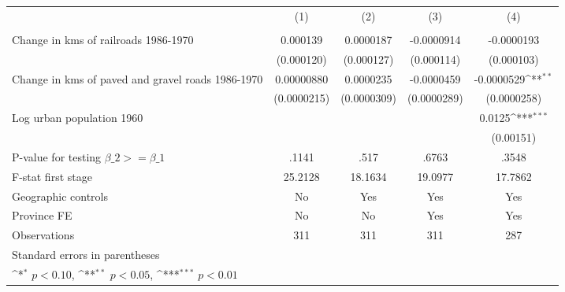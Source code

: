 {
\def\sym#1{\ifmmode^{#1}\else\(^{#1}\)\fi}
\begin{tabular}{l*{4}{c}}
\hline\hline
                &\multicolumn{1}{c}{(1)}&\multicolumn{1}{c}{(2)}&\multicolumn{1}{c}{(3)}&\multicolumn{1}{c}{(4)}\\
                &\multicolumn{1}{c}{}&\multicolumn{1}{c}{}&\multicolumn{1}{c}{}&\multicolumn{1}{c}{}\\
\hline
Change in kms of railroads 1986-1970& 0.000139         &0.0000187         &-0.0000914         &-0.0000193         \\
                &(0.000120)         &(0.000127)         &(0.000114)         &(0.000103)         \\
[1em]
Change in kms of paved and gravel roads 1986-1970&0.00000880         &0.0000235         &-0.0000459         &-0.0000529\sym{**} \\
                &(0.0000215)         &(0.0000309)         &(0.0000289)         &(0.0000258)         \\
[1em]
Log urban population 1960&                  &                  &                  &   0.0125\sym{***}\\
                &                  &                  &                  &(0.00151)         \\
\hline
P-value for testing $\beta\_{2} >= \beta\_{1}$&    .1141         &     .517         &    .6763         &    .3548         \\
F-stat first stage&  25.2128         &  18.1634         &  19.0977         &  17.7862         \\
Geographic controls&       No         &      Yes         &      Yes         &      Yes         \\
Province FE     &       No         &       No         &      Yes         &      Yes         \\
Observations    &      311         &      311         &      311         &      287         \\
\hline\hline
\multicolumn{5}{l}{\footnotesize Standard errors in parentheses}\\
\multicolumn{5}{l}{\footnotesize \sym{*} \(p<0.10\), \sym{**} \(p<0.05\), \sym{***} \(p<0.01\)}\\
\end{tabular}
}
